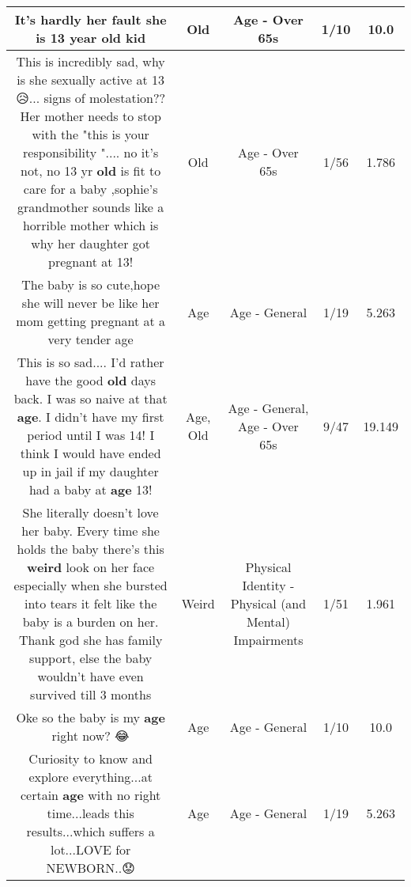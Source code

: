 \documentclass[11pt]{article}
\newlength\mylength
\begin{document}
\begin{center}
\begin{longtable}{|C{.65\mylength}|C{.30\mylength}|C{.12\mylength}|C{.12\mylength}|C{.12\mylength}|}
  \small It's hardly her fault she is 13 year \textbf{old} kid\normalsize   & Old & Age - Over 65s & 1/10 & 10.0 \\  \hline
  \small This is incredibly sad, why is she sexually active at 13😥... signs of molestation?? Her mother needs to stop with the "this is your responsibility ".... no it's not, no 13 yr \textbf{old} is fit to care for a baby ,sophie's grandmother sounds like a horrible mother which is why her daughter got pregnant at 13!\normalsize   & Old & Age - Over 65s & 1/56 & 1.786 \\  \hline
  \small The baby is so cute,hope she will never be like her mom getting pregnant at a very tender age\normalsize   & Age & Age - General & 1/19 & 5.263 \\  \hline
  \small This is so sad.... I'd rather have the good \textbf{old} days back. I was so naive at that \textbf{age}. I didn't have my first period until I was 14! I think I would have ended up in jail if my daughter had a baby at \textbf{age} 13!\normalsize   & Age, Old & Age - General, Age - Over 65s & 9/47 & 19.149 \\  \hline
  \small She literally doesn't love her baby. Every time she holds the baby there's this \textbf{weird} look on her face especially when she bursted into tears it felt like the baby is a burden on her. Thank god she has family support, else the baby wouldn't have even survived till 3 months\normalsize   & Weird & Physical Identity - Physical (and Mental) Impairments & 1/51 & 1.961 \\  \hline
  \small Oke so the baby is my \textbf{age} right now? 😂\normalsize   & Age & Age - General & 1/10 & 10.0 \\  \hline
  \small Curiosity to know and explore everything...at certain \textbf{age} with no right time...leads this results...which suffers a lot...LOVE for NEWBORN..😟\normalsize   & Age & Age - General & 1/19 & 5.263 \\  \hline

\end{longtable}
\end{center}
\end{document}

